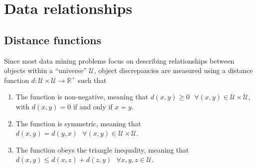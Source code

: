 \documentclass{report}
\begin{document}
\chapter{Data relationships}
\section{Distance functions}
Since most data mining problems focus on describing relationships between objects within a ``universe'' $\mathcal{U}$, object discrepancies are measured using a distance function $\displaystyle d: \mathcal{U} \times \mathcal{U} \to \mathbb{R}^+$ such that
\begin{enumerate}
    \item The function is non-negative, meaning that $\displaystyle d(x, y) \ge 0 \text{ } \forall (x, y) \in \mathcal{U} \times \mathcal{U}$, with $\displaystyle d(x, y) = 0$ if and only if $\displaystyle x = y$.
    \item The function is symmetric, meaning that $\displaystyle d(x, y) = d(y, x) \text{ } \forall (x, y) \in \mathcal{U} \times \mathcal{U}$.
    \item The function obeys the triangle inequality, meaning that $\displaystyle d(x, y) \leq d(x, z) + d(z, y) \text{ } \forall x, y, z \in \mathcal{U}$.
\end{enumerate}
\end{document}
